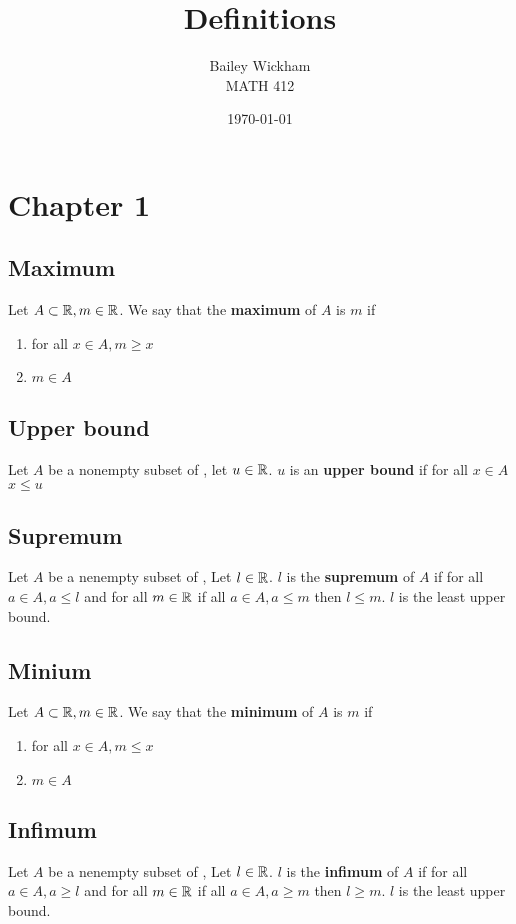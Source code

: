 \documentclass{article}
\title{Definitions}
\author{Bailey Wickham \\ MATH 412}
\date\today
\begin{document}
\maketitle

\section{Chapter 1}
\subsection{Maximum}
Let $A \subset \protect\mathbb{R}, m \in \protect\mathbb{R}$. We say that the \textbf{maximum} of $A$ is $m$ if
\begin{enumerate}
    \item for all $x \in A, m \ge x$
    \item $m \in A$
\end{enumerate}

\subsection{Upper bound}
Let $A$ be a nonempty subset of \bR, let $u \in \protect\mathbb{R}$. $u$ is an \textbf{upper bound} if for all $x\in A$ $x \le u$

\subsection{Supremum}
Let $A$ be a nenempty subset of \bR, Let $l \in \protect\mathbb{R}$. $l$ is the \textbf{supremum} of $A$ if for all $a \in A, a \le l$ and for all $m \in \protect\mathbb{R}$ if all $a \in A, a \le m$ then $l\le m$. $l$ is the least upper bound.

\subsection{Minium}
Let $A \subset \protect\mathbb{R}, m \in \protect\mathbb{R}$. We say that the \textbf{minimum} of $A$ is $m$ if
\begin{enumerate}
    \item for all $x \in A, m \le x$
    \item $m \in A$
\end{enumerate}

\subsection{Infimum}
Let $A$ be a nenempty subset of \bR, Let $l \in \protect\mathbb{R}$. $l$ is the \textbf{infimum} of $A$ if for all $a \in A, a \ge l$ and for all $m \in \protect\mathbb{R}$ if all $a \in A, a \ge m$ then $l\ge m$. $l$ is the least upper bound.
\end{document}
